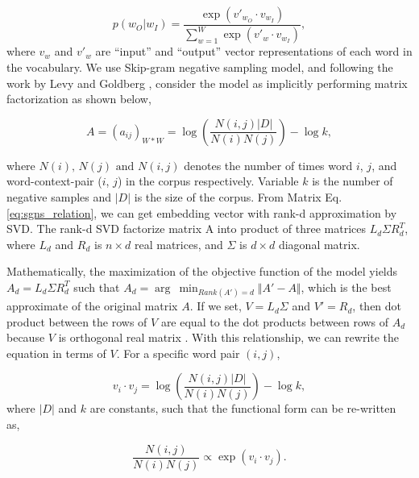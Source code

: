 \documentclass[12pt]{article} %
\begin{document}
\begin{equation}
    \label{eq:skipgram_conditional_expanded}
    p(w_O|w_I) = \frac{\exp(v'_{w_O} \cdot v_{w_I})}{\sum_{w=1}^{W} \exp(v'_w \cdot v_{w_I})},
\end{equation}
where $v_w$ and $v'_w$ are ``input'' and ``output'' vector representations of each word in the vocabulary.  We use Skip-gram negative sampling model, and following the work by Levy and Goldberg \autocite{levy2014neural}, consider the model as implicitly performing matrix factorization as shown below,

\begin{equation}
    \label{eq:sgns_relation}
    A = \left(a_{ij}\right)_{W*W} = \log \left(\frac{N(i, j) |D|}{N(i) N(j)} \right) - \log k,
\end{equation}

where $N(i)\text{, } N(j) \text{ and } N(i,j)$ denotes the number of times word $i$, $j$, and word-context-pair ($i$, $j$) in the corpus respectively. Variable $k$ is the number of negative samples and $|D|$ is the size of the corpus. From Matrix Eq.\ref{eq:sgns_relation}, we can get embedding vector with rank-d approximation by SVD. The rank-d SVD factorize matrix A into product of three matrices  $L_d \Sigma R_d^T$, where $L_d$ and $R_d$ is $n \times d$ real matrices, and $\Sigma$ is    $d \times d$ diagonal matrix.

Mathematically, the maximization of the objective function of the model yields $A_d = L_d \Sigma R_d^T$ such that $A_d = \arg \ \min_{Rank(A')=d} \Vert A' - A  \Vert$, which is the best approximate of the original matrix $A$. If we set, $V=L_d \Sigma$ and $V'=R_d$, then dot product between the rows of $V$ are equal to the dot products between rows of $A_d$ because $V$ is orthogonal real matrix  \autocite{levy2014neural}. With this relationship, we can rewrite the equation in terms of $V$.  For a specific word pair $(i,j)$,

\begin{equation}
    \label{eq:sgns_relation_w,i, w_j}
    v_{i} \cdot v_{j} =  \log \left(\frac{N(i, j) |D|}{N(i) N(j)} \right) - \log k,
\end{equation}
where $|D|$ and $k$ are constants, such that the functional form can be re-written as,

\begin{equation}
    \label{eq:sgns_relation_w,i, w_j}
     \frac{N(i, j)}{N(i) N(j)}  \propto  \exp(v_{i} \cdot v_{j} ).
\end{equation}
\end{document}
